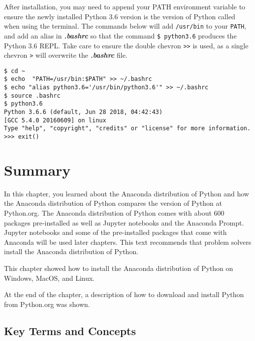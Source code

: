 \documentclass{book}
\newcommand{\passthrough}[1]{#1}
\begin{document}
After installation, you may need to append your PATH environment
variable to ensure the newly installed Python 3.6 version is the version
of Python called when using the terminal. The commands below will add
\passthrough{\lstinline!/usr/bin!} to your
\passthrough{\lstinline!PATH!}, and add an alias in
\textbf{\emph{.bashrc}} so that the command
\passthrough{\lstinline!$ python3.6!} produces the Python 3.6 REPL. Take
care to ensure the double chevron \passthrough{\lstinline!>>!} is used,
as a single chevron \passthrough{\lstinline!>!} will overwrite the
\textbf{\emph{.bashrc}} file.

\begin{lstlisting}
$ cd ~
$ echo  "PATH=/usr/bin:$PATH" >> ~/.bashrc 
$ echo "alias python3.6='/usr/bin/python3.6'" >> ~/.bashrc
$ source .bashrc
$ python3.6
Python 3.6.6 (default, Jun 28 2018, 04:42:43)
[GCC 5.4.0 20160609] on linux
Type "help", "copyright", "credits" or "license" for more information.
>>> exit()
\end{lstlisting}
    




    
        \newpage
        \hypertarget{summary}{%
\section{Summary}\label{summary}}

    




    
        In this chapter, you learned about the Anaconda distribution of Python
and how the Anaconda distribution of Python compares the version of
Python at Python.org. The Anaconda distribution of Python comes with
about 600 packages pre-installed as well as Jupyter notebooks and the
Anaconda Prompt. Jupyter notebooks and some of the pre-installed
packages that come with Anaconda will be used later chapters. This text
recommends that problem solvers install the Anaconda distribution of
Python.

This chapter showed how to install the Anaconda distribution of Python
on Windows, MacOS, and Linux.

At the end of the chapter, a description of how to download and install
Python from Python.org was shown.
    




    
        \hypertarget{key-terms-and-concepts}{%
\subsection{Key Terms and Concepts}\label{key-terms-and-concepts}}
    
\end{document}
